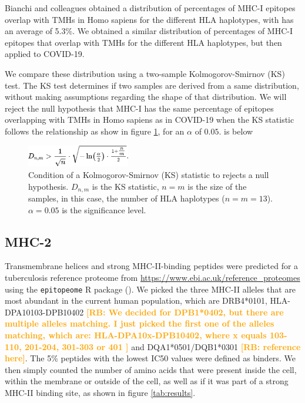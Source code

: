 \documentclass{article}
\newcommand{\richel}[1]{\textcolor{orange}{\textbf{[RB: #1]}}}
\begin{document}
Bianchi and colleagues obtained a distribution of 
percentages of MHC-I epitopes overlap with TMHs in Homo sapiens
for the different HLA haplotypes, with has an average of 5.3\%.
We obtained a similar distribution of percentages of MHC-I epitopes that 
overlap with TMHs for the different HLA haplotypes, but then applied to
COVID-19.

We compare these distribution using a two-sample 
Kolmogorov-Smirnov (KS) test. The KS test determines if two samples
are derived from a same distribution, without making assumptions
regarding the shape of that distribution. We will reject
the null hypothesis that MHC-I has the same percentage of epitopes 
overlapping with TMHs in Homo sapiens as in COVID-19 when 
the KS statistic follows the relationship as show in 
figure \ref{fig:ks}, for an $\alpha$ of $0.05$.
is below 

\begin{figure}[!htbp]
  \includegraphics[width=0.4\textwidth]{pics/ks.png}
  \caption{
    Condition of a Kolmogorov-Smirnov (KS) statistic to rejects a null
    hypothesis. $D_{n,m}$ is the KS statistic, $n = m$ is the size
    of the samples, in this case, the number of HLA haplotypes ($n = m = 13$).
    $\alpha = 0.05$ is the significance level.
  }
  \label{fig:ks}
\end{figure}

\subsection{MHC-2}

\iffalse
	Transmembrane helices and strong MHC-II-binding peptides
	were predicted for a tuberculosis reference proteome 
	from \url{https://www.ebi.ac.uk/reference_proteomes}
	using the \verb;epitopeome; R package (\cite{epitopeome}).
	We picked the three MHC-II alleles that are most abundant 
	in the current human population, 
	which are DRB4*0101, HLA-DPA10103-DPB10402 
	\richel{
	  We decided for DPB1*0402, but there are multiple alleles matching.
	  I just picked the first one of the alleles matching, which are:
	  HLA-DPA10x-DPB10402, where x equals 103-110, 201-204, 301-303 or 401
	}
	and DQA1*0501/DQB1*0301 \richel{reference here}.
	The 5\% peptides with the lowest IC50 values were defined as binders.
	We then simply counted the number of amino acids that were present inside the
	cell, within the membrane or outside of the cell, as well as if it was part 
	of a strong MHC-II binding site, as shown in figure \ref{tab:results}.
\end{document}
